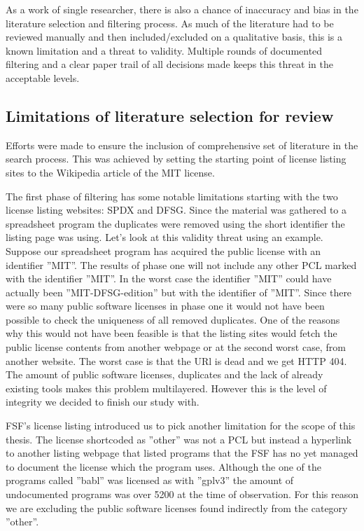As a work of single researcher, there is also a chance of inaccuracy and bias in the literature selection and filtering process. As much of the literature had to be reviewed manually and then included/excluded on a qualitative basis, this is a known limitation and a threat to validity. Multiple rounds of documented filtering and a clear paper trail of all decisions made keeps this threat in the acceptable levels.

\subsection{Limitations of literature selection for review}
Efforts were made to ensure the inclusion of comprehensive set of literature in the search process. This was achieved by setting the starting point of license listing sites to the Wikipedia article of the MIT license.

The first phase of filtering has some notable limitations starting with the two license listing websites: SPDX and DFSG. Since the material was gathered to a spreadsheet program the duplicates were removed using the short identifier the listing page was using. Let's look at this validity threat using an example. Suppose our spreadsheet program has acquired the public license with an identifier ''MIT''. The results of phase one will not include any other PCL marked with the identifier ''MIT''. In the worst case the identifier ''MIT'' could have actually been ''MIT-DFSG-edition'' but with the identifier of ''MIT''. Since there were so many public software licenses in phase one it would not have been possible to check the uniqueness of all removed duplicates. One of the reasons why this would not have been feasible is that the listing sites would fetch the public license contents from another webpage or at the second worst case, from another website. The worst case is that the URl is dead and we get HTTP 404. The amount of public software licenses, duplicates and the lack of already existing tools makes this problem multilayered. However this is the level of integrity we decided to finish our study with.

FSF's license listing introduced us to pick another limitation for the scope of this thesis. The license shortcoded as ''other'' was not a PCL but instead a hyperlink to another listing webpage that listed programs that the FSF has no yet managed to document the license which the program uses. Although the one of the programs called ''babl'' was licensed as with ''gplv3'' the amount of undocumented programs was over 5200 at the time of observation. For this reason we are excluding the public software licenses found indirectly from the category ''other''.

